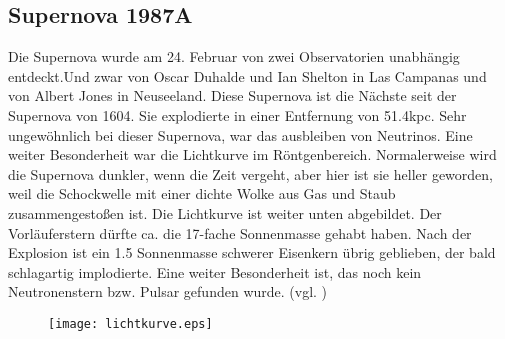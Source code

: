 \subsection{Supernova 1987A}
Die Supernova wurde am 24. Februar von zwei Observatorien unabhängig entdeckt.Und zwar von Oscar Duhalde und Ian Shelton in Las Campanas und von Albert Jones in Neuseeland. Diese Supernova ist die Nächste seit der Supernova von 1604. Sie explodierte in einer Entfernung von 51.4kpc. Sehr ungewöhnlich bei dieser Supernova, war das ausbleiben von Neutrinos. Eine weiter Besonderheit war die Lichtkurve im Röntgenbereich. Normalerweise wird die Supernova dunkler, wenn die Zeit vergeht, aber hier ist sie heller geworden, weil die Schockwelle mit einer dichte Wolke aus Gas und Staub zusammengestoßen ist. Die Lichtkurve ist weiter unten abgebildet. Der Vorläuferstern dürfte ca. die 17-fache Sonnenmasse gehabt haben. Nach der Explosion ist ein 1.5 Sonnenmasse schwerer Eisenkern übrig geblieben, der bald schlagartig implodierte. Eine weiter Besonderheit ist, das noch kein Neutronenstern bzw. Pulsar gefunden wurde. (vgl. \cite{bionta1987observation})

\begin{figure}[ht]
\begin{center}
\texttt{[image: lichtkurve.eps]}
\end{center}
\end{figure}
